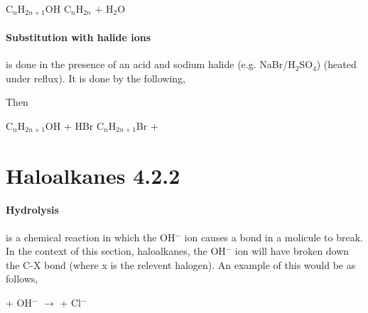 	C$_n$H$_{2n+1}$OH \ch{->[H "$_3$" {} PO  "$_4$" {}][reflux]} C$_n$H$_{2n}$ + H$_2$O
	
	\paragraph{Substitution with halide ions} is done in the presence of an acid and sodium halide (e.g. NaBr/H$_2$SO$_4$) (heated under reflux).
	It is done by the following,
	
	\begin{center}
	
		Then
		
		C$_n$H$_{2n+1}$OH + HBr \ch{->} C$_n$H$_{2n+1}$Br + 
	\end{center}
	
\section{Haloalkanes 4.2.2}
	
	\paragraph{Hydrolysis} is a chemical reaction in which the OH$^{-}$ ion causes a bond in a molicule to break.
	In the context of this section, haloalkanes, the OH$^{-}$ ion  will have broken down the C-X bond (where x is the relevent halogen).
	An example of this would be as follows,
	\begin{center}
		 + OH$^-$ $\longrightarrow$ 
		 + Cl$^-$
		
		\vspace{7mm}
		
	\end{center}